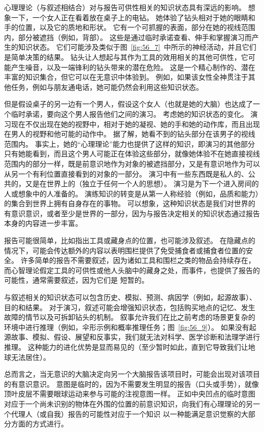 心理理论（与叙述相结合）对与报告可供性相关的知识状态具有深远的影响。
想象一下，一个女人正在看着放在桌子上的电钻。
她体验了钻头相对于她的眼睛和手的位置，以及它的质地和形状。
它有一个可抓握的表面，部分在她的视线范围内，部分被遮挡（例如，背部）。
这些是通过临时承诺查看、伸手和掌握演习而产生的知识状态。
它们可能涉及类似于图~\ref{fig:56_7}~中所示的神经活动，并且它们是简单决策的结果。
钻头让人想起与其作为工具的效用相关的其他可供性，它可能产生噪音，以及一端锋利的钻头带来的潜在危险。
这是一个精心制作的、潜在丰富的知识集合，但它可以在无意识中体验到。
例如，如果该女性全神贯注于其他任务，例如与朋友通电话，她可能仍然会利用这些知识状态。


但是假设桌子的另一边有一个男人，假设这个女人（也就是她的大脑）也达成了一个临时承诺，要向这个男人报告他们之间的演习。
考虑她的知识状态的变化。
演习现在不仅出现在她的视野中，相对于她的凝视、她的手和她的动作库，而且出现在男人的视野和他可能的动作中。
据了解，她看不到的钻头部分在该男子的视线范围内。
事实上，她的“心理理论”能力也提供了这样的知识，即演习的其他部分只有她能看到，而且这个男人可能正在体验这些部分，就像她体验不在她直接视线范围内的部分一样，既是前意识地作为对象的被遮挡部分，又是有意识地作为可以从另一个有利位置直接看到的对象的一部分。
演习中有一些东西既是私人的、公共的，又是在世界上的（独立于任何一个人的思想）。
演习是为下一个进入房间的人或想象中的人准备的。
演练知识的转变是从第一人称经验（例如，品质和能力）的集合到世界上拥有自身存在的事物。
可以想象，这种知识状态是我们对世界的有意识意识，或者至少是世界的一部分，因为与报告决定相关的知识状态通过报告本身的内容进一步丰富。


报告可能很简单，比如指出工具或藏身点的位置，也可能涉及叙述。
在隐藏点的情况下，可能会传达额外的内容以表明围栏提供了免受捕食者或捕食者位置的安全。
许多简单的报告不需要叙述，因为诸如工具和围栏之类的物品会持续存在，而心智理论假定工具的可供性或他人头脑中的藏身之处，而事件，也提供了报告的可能性，通常需要叙述，因为它们是 短暂的。


与叙述相关的知识状态可以包含历史、模拟、预测、病因学（例如，起源故事）、目的和结果。
对于演习，叙述可能会增强知识状态，包括购买地点的记忆、发生故障的情节以及可拆卸钻头的机制。
叙事允许我们在比之前考虑的场景更复杂的环境中进行推理（例如，伞形示例和概率推理任务；图~\ref{fig:56_9}）。
如果没有起源故事、模拟、假设、展望和反事实，我们就无法对科学、医学诊断和法理学进行推理。
这种能力的进化优势是显而易见的（至少暂时如此，直到它导致我们让地球无法居住）。


总而言之，当无意识的大脑决定向另一个大脑报告该项目时，可能会出现对该项目的有意识意识。
意图是临时的，因为不需要发生明显的报告（口头或手势），就像顶叶皮层不需要眼球运动来参与可能的注视意图一样。
正如中央凹点的临时意图对应于一个尚未识别的物体在外围的位置的前意识知识，向我们有心理理论的另一个代理人（或自我）报告的可能性对应于一个知识 以一种能满足意识觉察的大部分方面的方式进行。


